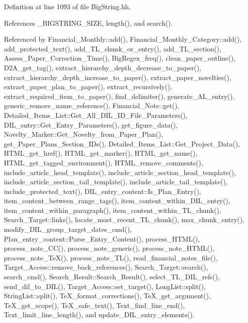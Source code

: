 Definition at line 1093 of file Big\-String.hh.

References \_\-BIGSTRING\_\-SIZE, length(), and search().

Referenced by Financial\_\-Monthly::add(), Financial\_\-Monthly\_\-Category::add(), add\_\-protected\_\-text(), add\_\-TL\_\-chunk\_\-or\_\-entry(), add\_\-TL\_\-section(), Assess\_\-Paper\_\-Correction\_\-Time(), Big\-Regex\_\-freq(), clean\_\-paper\_\-outline(), D2A\_\-get\_\-tag(), extract\_\-hierarchy\_\-depth\_\-decrease\_\-to\_\-paper(), extract\_\-hierarchy\_\-depth\_\-increase\_\-to\_\-paper(), extract\_\-paper\_\-novelties(), extract\_\-paper\_\-plan\_\-to\_\-paper(), extract\_\-recursively(), extract\_\-required\_\-item\_\-to\_\-paper(), find\_\-delimiter(), generate\_\-AL\_\-entry(), generic\_\-remove\_\-name\_\-reference(), Financial\_\-Note::get(), Detailed\_\-Items\_\-List::Get\_\-All\_\-DIL\_\-ID\_\-File\_\-Parameters(), DIL\_\-entry::Get\_\-Entry\_\-Parameters(), get\_\-figure\_\-data(), Novelty\_\-Marker::Get\_\-Novelty\_\-from\_\-Paper\_\-Plan(), get\_\-Paper\_\-Plans\_\-Section\_\-IDs(), Detailed\_\-Items\_\-List::Get\_\-Project\_\-Data(), HTML\_\-get\_\-href(), HTML\_\-get\_\-marker(), HTML\_\-get\_\-name(), HTML\_\-get\_\-tagged\_\-environment(), HTML\_\-remove\_\-comments(), include\_\-article\_\-head\_\-template(), include\_\-article\_\-section\_\-head\_\-template(), include\_\-article\_\-section\_\-tail\_\-template(), include\_\-article\_\-tail\_\-template(), include\_\-protected\_\-text(), DIL\_\-entry\_\-content::Is\_\-Plan\_\-Entry(), item\_\-content\_\-between\_\-range\_\-tags(), item\_\-content\_\-within\_\-DIL\_\-entry(), item\_\-content\_\-within\_\-paragraph(), item\_\-content\_\-within\_\-TL\_\-chunk(), Search\_\-Target::links(), locate\_\-most\_\-recent\_\-TL\_\-chunk(), max\_\-chunk\_\-entry(), modify\_\-DIL\_\-group\_\-target\_\-dates\_\-cmd(), Plan\_\-entry\_\-content::Parse\_\-Entry\_\-Content(), process\_\-HTML(), process\_\-note\_\-CC(), process\_\-note\_\-generic(), process\_\-note\_\-HTML(), process\_\-note\_\-Te\-X(), process\_\-note\_\-TL(), read\_\-financial\_\-notes\_\-file(), Target\_\-Access::remove\_\-back\_\-references(), Search\_\-Target::search(), search\_\-cmd(), Search\_\-Result::Search\_\-Result(), select\_\-TL\_\-DIL\_\-refs(), send\_\-dil\_\-to\_\-DIL(), Target\_\-Access::set\_\-target(), Long\-List::split(), String\-List::split(), Te\-X\_\-format\_\-corrections(), Te\-X\_\-get\_\-argument(), Te\-X\_\-get\_\-scope(), Te\-X\_\-safe\_\-text(), Text\_\-find\_\-line\_\-end(), Text\_\-limit\_\-line\_\-length(), and update\_\-DIL\_\-entry\_\-elements().



